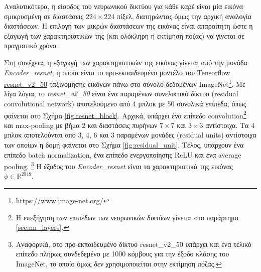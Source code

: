 Αναλυτικότερα, η είσοδος του νευρωνικού δικτύου για κάθε καρέ είναι μία εικόνα σμικρυσμένη σε διαστάσεις $224 \times 224$ πίξελ, διατηρώντας όμως την αρχική αναλογία διαστάσεων. Η επιλογή των μικρών διαστάσεων της εικόνας είναι απαραίτητη ώστε η εξαγωγή των χαρακτηριστικών της (και ολόκληρη η εκτίμηση πόζας) να γίνεται σε πραγματικό χρόνο.

Στη συνέχεια, η εξαγωγή των χαρακτηριστικών της εικόνας γίνεται από την μονάδα \textsl{Encoder\_resnet}, η οποία είναι το προ-εκπαιδευμένο μοντέλο του Tensorflow \href{https://github.com/tensorflow/models/blob/master/research/slim/nets/resnet\_v2.py}{resnet\_v2\_50} ταξινόμησης εικόνων πάνω στο σύνολο δεδομένων ImageNet\footnote{\href{https://www.image-net.org/}{https://www.image-net.org/}}. Με λίγα λόγια, το \textsl{resnet\_v2\_50} είναι ένα παραμένων συνελικτικό δίκτυο (residual convolutional network) αποτελούμενο από 4 μπλοκ με 50 συνολικά επίπεδα, όπως φαίνεται στο Σχήμα \ref{fig:resnet_block}. Αρχικά, υπάρχει ένα επίπεδο convolution\footnote{Η επεξήγηση των επιπέδων των νευρωνικών δικτύων γίνεται στο παράρτημα \ref{sec:nn_layers}.} και max-pooling με βήμα 2 και διαστάσεις πυρήνων $7 \times 7$ και $3 \times 3$ αντίστοιχα. Τα 4 μπλοκ αποτελούνται από 3, 4, 6 και 3 παραμένων μονάδες (residual units) αντίστοιχα των οποίων η δομή φαίνεται στο Σχήμα \ref{fig:residual_unit}. Τέλος, υπάρχουν ένα επίπεδο batch normalization, ένα επίπεδο ενεργοποίησης ReLU και ένα average pooling. \footnote{Αναφορικά, στο προ-εκπαιδευμένο δίκτυο resnet\_v2\_50 υπάρχει και ένα τελικό επίπεδο πλήρως συνδεδεμένο με 1000 κόμβους για την έξοδο κλάσης του ImageNet, το οποίο όμως δεν χρησιμοποιείται στην εκτίμηση πόζας.} Η έξοδος του \textsl{Encoder\_resnet} είναι τα χαρακτηριστικά της εικόνας $\phi \in \mathbb{R}^{2048}$.

